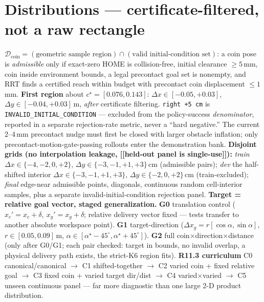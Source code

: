 \documentclass[11pt]{article}
\newcommand{\code}[1]{\texttt{\small #1}}
\begin{document}
\section{Distributions --- certificate-filtered, not a raw rectangle}
$\mathcal D_{\mathrm{coin}}=(\text{geometric sample region})\cap(\text{valid initial-condition set})$: a coin pose is
\emph{admissible} only if exact-zero HOME is collision-free, initial clearance $\geq5$\,mm, coin inside environment
bounds, a legal precontact goal set is nonempty, and RRT finds a certified reach within budget with precontact coin
displacement $\leq1$\,mm. \textbf{First region} about $c^\star=[0.076,0.143]$: $\Delta x\in[-0.05,+0.03]$,
$\Delta y\in[-0.04,+0.03]$\,m, \emph{after} certificate filtering. \code{right +5\,cm} is
\code{INVALID\_INITIAL\_CONDITION} --- excluded from the policy-success \emph{denominator}, reported in a separate
rejection-rate metric, never a ``hard negative.'' The current 2--4\,mm precontact nudge must first be closed with larger
obstacle inflation; only precontact-motion-gate-passing rollouts enter the demonstration bank.
\textbf{Disjoint grids (no interpolation leakage, [[held-out panel is single-use]]):} \emph{train} $\Delta x\in\{-4,-2,0,
+2\}$, $\Delta y\in\{-3,-1,+1,+3\}$\,cm (admissible pairs); \emph{dev} the half-shifted interior $\Delta x\in\{-3,-1,+1,
+3\}$, $\Delta y\in\{-2,0,+2\}$\,cm (train-excluded); \emph{final} edge-near admissible points, diagonals, continuous
random cell-interior samples, plus a separate invalid-initial-condition rejection panel.
\textbf{Target = relative goal vector, staged generalization.} \textbf{G0} translation control
($x_c'=x_c+\delta,\ x_g'=x_g+\delta$; relative delivery vector fixed --- tests transfer to another absolute workspace
point). \textbf{G1} target-direction ($\Delta x_g=r[\cos\alpha,\sin\alpha]$, $r\in[0.05,0.09]$\,m,
$\alpha\in[\alpha^\star-45^\circ,\alpha^\star+45^\circ]$). \textbf{G2} full coin$\times$direction$\times$distance
(only after G0/G1; each pair checked: target in bounds, no invalid overlap, a physical delivery path exists, the strict-K6
region fits). \textbf{R11.3 curriculum} C0 canonical/canonical $\to$ C1 shifted-together $\to$ C2 varied coin + fixed
relative goal $\to$ C3 fixed coin + varied target dir/dist $\to$ C4 varied$\times$varied $\to$ C5 unseen continuous panel
--- far more diagnostic than one large 2-D product distribution.
\end{document}
